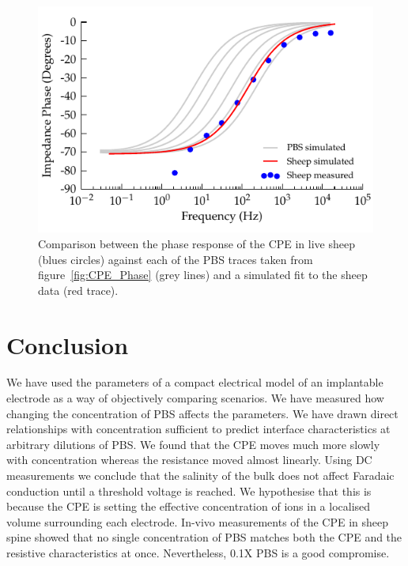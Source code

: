 \documentclass[10pt,final,journal]{IEEEtran}
\begin{document}
\begin{figure}
    \begin{center}
        \includegraphics{graphics/displacement-withSheep_impedanceVsFrequency_phase}
    \end{center}
    \caption{Comparison between the phase response of the CPE in live sheep (blues circles) against each of the PBS traces taken from figure~\ref{fig:CPE_Phase} (grey lines) and a simulated fit to the sheep data (red trace).}
    \label{fig:displacement_sheepCPEPhase}
\end{figure}

\section{Conclusion}

We have used the parameters of a compact electrical model of an implantable electrode as a way of objectively comparing scenarios.
We have measured how changing the concentration of PBS affects the parameters. 
We have drawn direct relationships with concentration sufficient to predict interface characteristics at arbitrary dilutions of PBS. 
We found that the CPE moves much more slowly with concentration whereas the resistance moved almost linearly. 
Using DC measurements we conclude that the salinity of the bulk does not affect Faradaic conduction until a threshold voltage is reached. We hypothesise that this is because the CPE is setting the effective concentration of ions in a localised volume surrounding each electrode. In-vivo measurements of the CPE in sheep spine showed that no single concentration of PBS matches both the CPE and the resistive characteristics at once. Nevertheless, 0.1X PBS is a good compromise.
\end{document}
